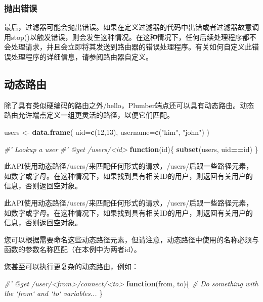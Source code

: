 \documentclass[]{book}
\newenvironment{Shaded}{\begin{snugshade}}{\end{snugshade}}
\newcommand{\KeywordTok}[1]{\textcolor[rgb]{0.13,0.29,0.53}{\textbf{#1}}}
\newcommand{\DataTypeTok}[1]{\textcolor[rgb]{0.13,0.29,0.53}{#1}}
\newcommand{\DecValTok}[1]{\textcolor[rgb]{0.00,0.00,0.81}{#1}}
\newcommand{\StringTok}[1]{\textcolor[rgb]{0.31,0.60,0.02}{#1}}
\newcommand{\CommentTok}[1]{\textcolor[rgb]{0.56,0.35,0.01}{\textit{#1}}}
\newcommand{\ControlFlowTok}[1]{\textcolor[rgb]{0.13,0.29,0.53}{\textbf{#1}}}
\newcommand{\OperatorTok}[1]{\textcolor[rgb]{0.81,0.36,0.00}{\textbf{#1}}}
\newcommand{\NormalTok}[1]{#1}
\begin{document}
\subsubsection{抛出错误}

最后，过滤器可能会抛出错误。如果在定义过滤器的代码中出错或者过滤器故意调用stop()以触发错误，则会发生这种情况。在这种情况下，任何后续处理程序都不会处理请求，并且会立即将其发送到路由器的错误处理程序。有关如何自定义此错误处理程序的详细信息，请参阅路由器自定义。

\subsection{动态路由}

除了具有类似硬编码的路由之外/hello，Plumber端点还可以具有动态路由。动态路由允许端点定义一组更灵活的路径，以便它们匹配。

\begin{Shaded}
\begin{Highlighting}[]
\NormalTok{users <-}\StringTok{ }\KeywordTok{data.frame}\NormalTok{(}
  \DataTypeTok{uid=}\KeywordTok{c}\NormalTok{(}\DecValTok{12}\NormalTok{,}\DecValTok{13}\NormalTok{),}
  \DataTypeTok{username=}\KeywordTok{c}\NormalTok{(}\StringTok{"kim"}\NormalTok{, }\StringTok{"john"}\NormalTok{)}
\NormalTok{)}

\CommentTok{#' Lookup a user}
\CommentTok{#' @get /users/<id>}
\ControlFlowTok{function}\NormalTok{(id)\{}
  \KeywordTok{subset}\NormalTok{(users, uid}\OperatorTok{==}\NormalTok{id)}
\NormalTok{\}}
\end{Highlighting}
\end{Shaded}

此API使用动态路径/users/来匹配任何形式的请求，/users/后跟一些路径元素，如数字或字母。在这种情况下，如果找到具有相关ID的用户，则返回有关用户的信息，否则返回空对象。

此API使用动态路径/users/来匹配任何形式的请求，/users/后跟一些路径元素，如数字或字母。在这种情况下，如果找到具有相关ID的用户，则返回有关用户的信息，否则返回空对象。

您可以根据需要命名这些动态路径元素，但请注意，动态路径中使用的名称必须与函数的参数名称匹配（在本例中为两者id）。

您甚至可以执行更复杂的动态路由，例如：

\begin{Shaded}
\begin{Highlighting}[]
\CommentTok{#' @get /user/<from>/connect/<to>}
\ControlFlowTok{function}\NormalTok{(from, to)\{}
  \CommentTok{# Do something with the `from` and `to` variables...}
\NormalTok{\}}
\end{Highlighting}
\end{Shaded}
\end{document}
